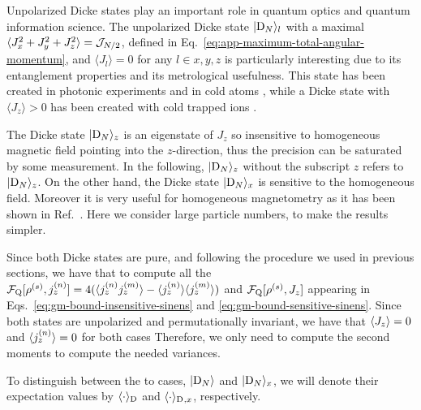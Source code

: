 
Unpolarized Dicke states play an important role in quantum optics and quantum information science.
The unpolarized Dicke state $\vert{\ensuremath{\textnormal{D}_{N}}}\rangle_l$ with a maximal $\langle{J_x^2+J_y^2+J_z^2}\rangle=\mathcal{J}_{N/2}$, defined in Eq.~\eqref{eq:app-maximum-total-angular-momentum}, and $\langle J_l\rangle=0$ for any $l\in x,y,z$ is particularly interesting due to its entanglement properties and its metrological usefulness.
This state has been created in photonic experiments \cite{Kiesel2007,Wieczorek2009,Chiuri2012} and in cold atoms \cite{Luecke2011,Hamley2012}, while a Dicke state with $\langle J_z\rangle>0$ has been created with cold trapped ions \cite{haeffner2005}.

The Dicke state $\vert{\ensuremath{\textnormal{D}_{N}}}\rangle_z$ is an eigenstate of $J_z$ so insensitive to homogeneous magnetic field pointing into the $z$-direction, thus the precision can be saturated by some measurement.
In the following, $\vert{\ensuremath{\textnormal{D}_{N}}}\rangle_z$ without the subscript $z$ refers to $\vert{\ensuremath{\textnormal{D}_{N}}}\rangle_z$.
On the other hand, the Dicke state $\vert{\ensuremath{\textnormal{D}_{N}}}\rangle_x$ is sensitive to the homogeneous field.
Moreover it is very useful for homogeneous magnetometry as it has been shown in Ref.~\cite{Holland1993}.
Here we consider large particle numbers, to make the results simpler.

Since both Dicke states are pure, and following the procedure we used in previous sections, we have that to compute all the $\mathcal{F}_{\textnormal{Q}}[{\textstyle \rho^{(s)},j_z^{(n)}}]=4(\langle{j_z^{(n)}j_z^{(m)}}\rangle-\langle{j_z^{(n)}}\rangle\langle{j_z^{(m)}}\rangle)$ and $\mathcal{F}_{\textnormal{Q}}[{\textstyle \rho^{(s)},J_z}]$ appearing in Eqs.~\eqref{eq:gm-bound-insensitive-sinens} and \eqref{eq:gm-bound-sensitive-sinens}.
Since both states are unpolarized and permutationally invariant, we have that $\langle{J_z}\rangle=0$ and $\langle{j_z^{(n)}}\rangle=0$ for both cases
Therefore, we only need to compute the second moments to compute the needed variances.

To distinguish between the to cases, $\vert{\ensuremath{\textnormal{D}_{N}}}\rangle$ and $\vert{\ensuremath{\textnormal{D}_{N}}}\rangle_x$, we will denote their expectation values by $\langle{\cdot}\rangle_{\textnormal{D}_{}}$ and $\langle{\cdot}\rangle_{\textnormal{D}_{},x}$, respectively.

